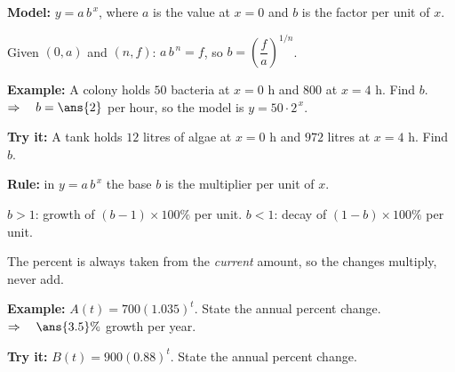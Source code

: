 \documentclass[12pt]{article}
\begin{document}


\begin{formulabox}
\textbf{Model:} $y = a\,b^{\,x}$, where $a$ is the value at $x = 0$ and $b$ is the factor per unit of $x$.\par
Given $(0, a)$ and $(n, f)$: \quad $a\,b^{\,n} = f$, so $b = \left(\dfrac{f}{a}\right)^{1/n}$.
\end{formulabox}

\begin{examplebox}
\textbf{Example:} \quad A colony holds $50$ bacteria at $x = 0$ h and $800$ at $x = 4$ h. Find $b$.
$\Rightarrow\quad b = \ans{2}$ per hour, so the model is $y = 50 \cdot 2^{\,x}$.
\end{examplebox}

\begin{tryitbox}
\textbf{Try it:} \quad A tank holds $12$ litres of algae at $x = 0$ h and $972$ litres at $x = 4$ h. Find $b$.\\[2pt]
\end{tryitbox}


\begin{formulabox}
\textbf{Rule:} in $y = a\,b^{\,x}$ the base $b$ is the multiplier per unit of $x$.\par
$b > 1$: growth of $(b - 1) \times 100\%$ per unit. \quad $b < 1$: decay of $(1 - b) \times 100\%$ per unit.\par
The percent is always taken from the \emph{current} amount, so the changes multiply, never add.
\end{formulabox}

\begin{examplebox}
\textbf{Example:} \quad $A(t) = 700(1.035)^t$. State the annual percent change.
$\Rightarrow\quad \ans{3.5}\%$ growth per year.
\end{examplebox}

\begin{tryitbox}
\textbf{Try it:} \quad $B(t) = 900(0.88)^t$. State the annual percent change.\\[2pt]
\end{tryitbox}
\end{document}
